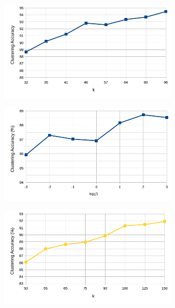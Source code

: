   \begin{figure}[!h]
  \centering
  \begin{subfigure}[b]{0.43\linewidth}
    \includegraphics[width=\linewidth]{images/cluster_k_apy}
    \caption{}
  \end{subfigure}
%
  \begin{subfigure}[b]{0.43\linewidth}
    \includegraphics[width=\linewidth]{images/cluster_beta_apy}
    \caption{}
  \end{subfigure}
    \begin{subfigure}[b]{0.43\linewidth}
    \includegraphics[width=\linewidth]{images/cluster_k}

\end{subfigure}
\end{figure}
